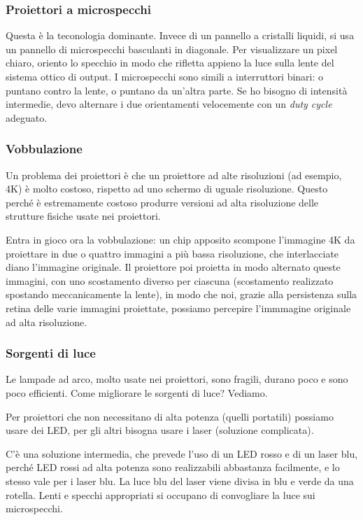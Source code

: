\documentclass[a4paper,11pt]{article}
\begin{document}
\subsubsection{Proiettori a microspecchi}
Questa è la teconologia dominante. Invece di un pannello a cristalli liquidi, si usa un pannello di microspecchi basculanti in diagonale.
Per visualizzare un pixel chiaro, oriento lo specchio in modo che rifletta appieno la luce sulla lente del sistema ottico
di output. I microspecchi sono simili a interruttori binari: o puntano contro la lente, o puntano da un'altra parte.
Se ho bisogno di intensità intermedie, devo alternare i due orientamenti velocemente con un \textit{duty cycle} adeguato.

\subsubsection{Vobbulazione}
Un problema dei proiettori è che un proiettore ad alte risoluzioni (ad esempio, 4K) è molto costoso, rispetto ad uno schermo di uguale risoluzione.
Questo perché è estremamente costoso produrre versioni ad alta risoluzione delle strutture fisiche usate nei proiettori.
\par
Entra in gioco ora la vobbulazione: un chip apposito scompone l'immagine 4K da proiettare in due o quattro immagini a più bassa risoluzione, che interlacciate diano l'immagine originale.
Il proiettore poi proietta in modo alternato queste immagini, con uno scostamento diverso per ciascuna (scostamento realizzato spostando meccanicamente la lente),
in modo che noi, grazie alla persistenza sulla retina delle varie immagini proiettate, possiamo percepire l'immmagine originale ad alta risoluzione.

\subsubsection{Sorgenti di luce}
Le lampade ad arco, molto usate nei proiettori, sono fragili, durano poco e sono poco efficienti. Come migliorare le sorgenti di luce? Vediamo.
\par
Per proiettori che non necessitano di alta potenza (quelli portatili) possiamo usare dei LED, per gli altri bisogna usare i laser (soluzione complicata).
\par
C'è una soluzione intermedia, che prevede l'uso di un LED rosso e di un laser blu, perché LED rossi ad alta potenza sono realizzabili abbastanza facilmente, e lo stesso vale per i laser blu.
La luce blu del laser viene divisa in blu e verde da una rotella. Lenti e specchi appropriati si occupano di convogliare la luce sui microspecchi.
\end{document}
